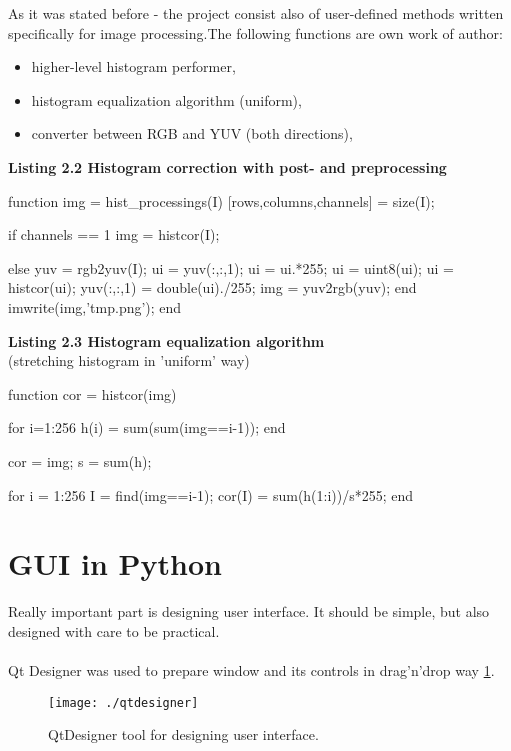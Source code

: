 \documentclass[eng,openany]{mgr}
\begin{document}
As it was stated before -  the project consist also of user-defined methods written specifically for image processing.The following functions are own work of author:
\begin{itemize}
\item higher-level histogram performer,
\item histogram equalization algorithm (uniform),
\item converter between RGB and YUV (both directions),
\end{itemize}
\newpage
\noindent
\textbf{Listing 2.2 Histogram correction with post- and preprocessing}
\begin{python}
function img = hist_processings(I)
[rows,columns,channels] =  size(I);

if channels == 1
  img = histcor(I);

else
  yuv = rgb2yuv(I);
  ui = yuv(:,:,1);
  ui = ui.*255;
  ui = uint8(ui);
  ui = histcor(ui);
  yuv(:,:,1) = double(ui)./255;
  img = yuv2rgb(yuv);
end
imwrite(img,'tmp.png');
end
\end{python}
\vspace{30pt}
\textbf{Listing 2.3 Histogram equalization algorithm}\\
(stretching histogram in 'uniform' way)
\begin{python}
function cor = histcor(img)

for i=1:256
h(i) = sum(sum(img==i-1));
end

cor = img;
s = sum(h);

for i = 1:256
I = find(img==i-1);
cor(I) = sum(h(1:i))/s*255;
end
\end{python}
\newpage
\section{GUI in Python}
Really important part is designing user interface. It should be simple, but also designed with care to be practical.
\\
\\
Qt Designer was used to prepare window and its controls in drag'n'drop way \ref{fig:qtdesigner}.
\begin{figure}[h]
\centering
\texttt{[image: ./qtdesigner]}
\caption{QtDesigner tool for designing user interface.}
\label{fig:qtdesigner}
\end{figure}
\end{document}
